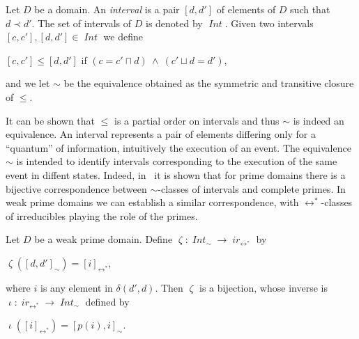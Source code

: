 \documentclass[conference]{IEEEtran}
\newcommand{\ir}[1]{\ensuremath{\mathop{\mathit{ir}({#1})}}}
\newcommand{\diff}[2]{\ensuremath{\delta({#1},{#2})}}
\newcommand{\pred}[1]{\ensuremath{\mathit{p}({#1})}}
\newcommand{\eqclass}[2][]{\ensuremath{[{#2}]_{\scriptscriptstyle {#1}}}}
\newcommand{\eqclassir}[1]{\ensuremath{\eqclass[\leftrightarrow^*]{#1}}}
\newcommand{\quotient}[2]{\ensuremath{{#1}_{\scriptscriptstyle {#2}}}}
\newcommand{\dint}[2]{\ensuremath{[{#1},{#2}]}}
\newcommand{\IntSet}[1]{\ensuremath{\mathop{\mathit{Int}({#1})}}}
\newcommand{\inir}{\ensuremath{\mathop{\mathit{\zeta}}}}
\newcommand{\irin}{\ensuremath{\mathop{\mathit{\iota}}}}
\begin{document}
\begin{definition}[interval]
  \label{de:interval}
  Let $D$ be a domain. An \emph{interval} is a pair $\dint{d}{d'}$ of
  elements of $D$ such that $d \prec d'$. The set of intervals of $D$
  is denoted by $\IntSet{D}$.
  Given two intervals $\dint{c}{c'}, \dint{d}{d'} \in \IntSet{D}$ we define
  \begin{center}
    $\dint{c}{c'} \leq \dint{d}{d'}$ \quad if $(c = c' \sqcap d)\ \wedge \ (c'
    \sqcup d = d')$, 
  \end{center}
  and we let $\sim$ be the equivalence obtained as the
  symmetric and transitive closure of $\leq$.
\end{definition}
%
It can be shown that $\leq$ is a partial order on intervals and thus $\sim$
is indeed an equivalence. An interval represents a pair of elements
differing only for a ``quantum'' of information, intuitively the
execution of an event. The equivalence $\sim$ is intended to identify
intervals corresponding to the execution of the same event in diffent states.
%
Indeed, in~\cite{NPW:PNES} it is shown that for prime domains there is a
bijective correspondence between $\sim$-classes of intervals and
complete primes.
%
In weak prime domains we can establish a similar correspondence, with $\leftrightarrow^*$-classes of irreducibles 
playing the role of the primes.

\begin{lemma}
  \label{le:int-vs-irr}
  Let $D$ be a weak prime domain. Define $\inir : \quotient{\IntSet{D}}{\sim} \to \quotient{\ir{D}}{\leftrightarrow^*}$ by
  \begin{center}
    $\inir(\dint{d}{d'}_\sim) = \eqclassir{i}$,
  \end{center}
  where $i$ is any element in $\diff{d'}{d}$. Then $\inir$ is a bijection, whose inverse is  $\irin :  \quotient{\ir{D}}{\leftrightarrow^*} \to \quotient{\IntSet{D}}{\sim}$
  defined by
  \begin{center}
    $\irin(\eqclassir{i}) = \dint{\pred{i}}{i}_\sim$.
  \end{center}
\end{lemma}
\end{document}
